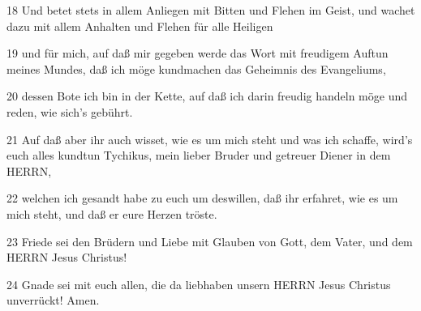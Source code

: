 \par 18 Und betet stets in allem Anliegen mit Bitten und Flehen im Geist, und wachet dazu mit allem Anhalten und Flehen für alle Heiligen
\par 19 und für mich, auf daß mir gegeben werde das Wort mit freudigem Auftun meines Mundes, daß ich möge kundmachen das Geheimnis des Evangeliums,
\par 20 dessen Bote ich bin in der Kette, auf daß ich darin freudig handeln möge und reden, wie sich's gebührt.
\par 21 Auf daß aber ihr auch wisset, wie es um mich steht und was ich schaffe, wird's euch alles kundtun Tychikus, mein lieber Bruder und getreuer Diener in dem HERRN,
\par 22 welchen ich gesandt habe zu euch um deswillen, daß ihr erfahret, wie es um mich steht, und daß er eure Herzen tröste.
\par 23 Friede sei den Brüdern und Liebe mit Glauben von Gott, dem Vater, und dem HERRN Jesus Christus!
\par 24 Gnade sei mit euch allen, die da liebhaben unsern HERRN Jesus Christus unverrückt! Amen.

